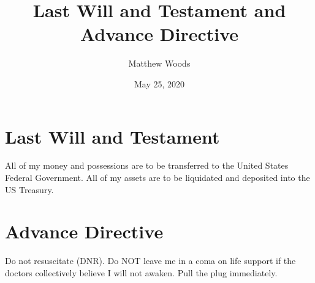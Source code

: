 \documentclass{article}
\title{Last Will and Testament and Advance Directive}
\author{Matthew Woods}
\date{May 25, 2020}
\begin{document}
\maketitle

\section{Last Will and Testament}
All of my money and possessions are to be transferred to the United States Federal Government. All of my assets are to be liquidated and deposited into the US Treasury. 

\section{Advance Directive}
Do not resuscitate (DNR). Do NOT leave me in a coma on life support if the doctors collectively believe I will not awaken. Pull the plug immediately. 
\end{document}
